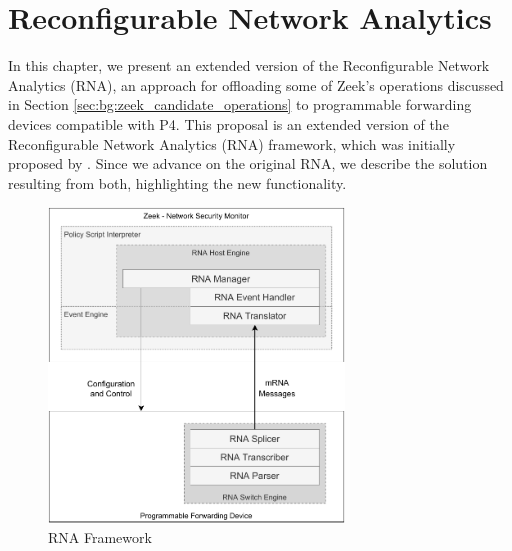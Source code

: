\chapter{Reconfigurable Network Analytics}
\label{cap:rna}



In this chapter, we present an extended version of the Reconfigurable Network Analytics (RNA), an approach for offloading some of Zeek's operations discussed in Section \ref{sec:bg:zeek_candidate_operations} to programmable forwarding devices compatible with P4. This proposal is an extended version of the Reconfigurable Network Analytics (RNA) framework, which was initially proposed by  . Since we advance on the original RNA, we describe the solution resulting from both, highlighting the new functionality.

\begin{figure}[h]
    \caption{RNA Framework}
    \begin{center}
        \includegraphics[width=0.7\textwidth]{images/arch_high_level.pdf}  
    \end{center}
    \label{fig:arch_high_level}
\end{figure}

